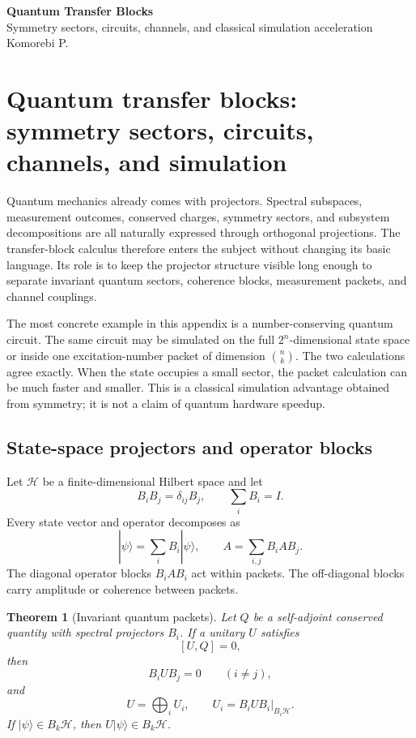 \documentclass[10pt]{article}
\newtheorem{theorem}{Theorem}
\begin{document}
\begin{center}
{\Large\bfseries Quantum Transfer Blocks}\\[4pt]
{\large Symmetry sectors, circuits, channels, and classical simulation acceleration}\\[5pt]
{\large Komorebi P.}
\end{center}
\tableofcontents
\clearpage

\section{Quantum transfer blocks: symmetry sectors, circuits, channels, and simulation}
\label{secdir:030q}
\label{app:quantum-transfer-blocks}

Quantum mechanics already comes with projectors.  Spectral subspaces, measurement outcomes, conserved charges, symmetry sectors, and subsystem decompositions are all naturally expressed through orthogonal projections.  The transfer-block calculus therefore enters the subject without changing its basic language.  Its role is to keep the projector structure visible long enough to separate invariant quantum sectors, coherence blocks, measurement packets, and channel couplings.

The most concrete example in this appendix is a number-conserving quantum circuit.  The same circuit may be simulated on the full $2^n$-dimensional state space or inside one excitation-number packet of dimension $\binom nk$.  The two calculations agree exactly.  When the state occupies a small sector, the packet calculation can be much faster and smaller.  This is a classical simulation advantage obtained from symmetry; it is not a claim of quantum hardware speedup.

\subsection{State-space projectors and operator blocks}

Let $\mathcal H$ be a finite-dimensional Hilbert space and let
\[
        B_iB_j=\delta_{ij}B_j,
        \qquad
        \sum_iB_i=I.
\]
Every state vector and operator decomposes as
\[
        |\psi\rangle=\sum_iB_i|\psi\rangle,
        \qquad
        A=\sum_{i,j}B_iAB_j.
\]
The diagonal operator blocks $B_iAB_i$ act within packets.  The off-diagonal blocks carry amplitude or coherence between packets.

\begin{theorem}[Invariant quantum packets]
Let $Q$ be a self-adjoint conserved quantity with spectral projectors $B_i$.  If a unitary $U$ satisfies
\[
        [U,Q]=0,
\]
then
\[
        B_iUB_j=0\qquad(i\ne j),
\]
and
\[
        U=\bigoplus_i U_i,
        \qquad U_i=B_iUB_i|_{B_i\mathcal H}.
\]
If $|\psi\rangle\in B_k\mathcal H$, then $U|\psi\rangle\in B_k\mathcal H$.
\end{theorem}
\end{document}
